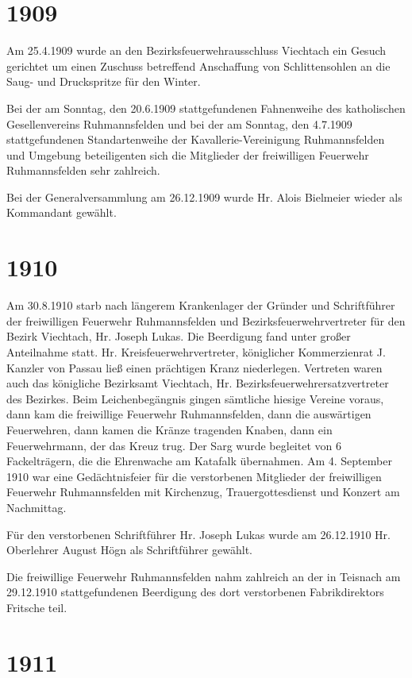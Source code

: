 \documentclass[12pt,a4paper]{book}
\begin{document}
\section*{1909}

Am 25.4.1909 wurde an den Bezirksfeuerwehrausschluss Viechtach ein Gesuch
gerichtet um einen Zuschuss betreffend Anschaffung von Schlittensohlen an die
Saug- und Druckspritze für den Winter.

Bei der am Sonntag, den 20.6.1909 stattgefundenen Fahnenweihe des katholischen
Gesellenvereins Ruhmannsfelden und bei der am Sonntag, den 4.7.1909
stattgefundenen Standartenweihe der Kavallerie-Vereinigung Ruhmannsfelden und
Umgebung beteiligenten sich die Mitglieder der freiwilligen Feuerwehr
Ruhmannsfelden sehr zahlreich.

Bei der Generalversammlung am 26.12.1909 wurde Hr. Alois Bielmeier wieder als
Kommandant gewählt.

\section*{1910}

Am 30.8.1910 starb nach längerem Krankenlager der Gründer und Schriftführer der
freiwilligen Feuerwehr Ruhmannsfelden und Bezirksfeuerwehrvertreter für den
Bezirk Viechtach, Hr. Joseph Lukas. Die Beerdigung fand unter großer Anteilnahme
statt. Hr. Kreisfeuerwehrvertreter, königlicher Kommerzienrat J. Kanzler von
Passau ließ einen prächtigen Kranz niederlegen. Vertreten waren auch das
königliche Bezirksamt Viechtach, Hr. Bezirksfeuerwehrersatzvertreter des
Bezirkes. Beim Leichenbegängnis gingen sämtliche hiesige Vereine voraus, dann
kam die freiwillige Feuerwehr Ruhmannsfelden, dann die auswärtigen Feuerwehren,
dann kamen die Kränze tragenden Knaben, dann ein Feuerwehrmann, der das Kreuz
trug. Der Sarg wurde begleitet von 6 Fackelträgern, die die Ehrenwache am
Katafalk übernahmen. Am 4. September 1910 war eine Gedächtnisfeier für die
verstorbenen Mitglieder der freiwilligen Feuerwehr Ruhmannsfelden mit
Kirchenzug, Trauergottesdienst und Konzert am Nachmittag.

Für den verstorbenen Schriftführer Hr. Joseph Lukas wurde am 26.12.1910 Hr.
Oberlehrer August Högn als Schriftführer gewählt.

Die freiwillige Feuerwehr Ruhmannsfelden nahm zahlreich an der in Teisnach am
29.12.1910 stattgefundenen Beerdigung des dort verstorbenen Fabrikdirektors
Fritsche teil.

\section*{1911}
\end{document}
